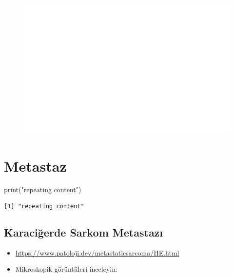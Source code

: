 \documentclass[
  letterpaper,
  DIV=11,
  numbers=noendperiod]{scrreprt}
\newenvironment{Shaded}{}{}
\newcommand{\FunctionTok}[1]{\textcolor[rgb]{0.02,0.16,0.49}{#1}}
\newcommand{\NormalTok}[1]{#1}
\newcommand{\StringTok}[1]{\textcolor[rgb]{0.25,0.44,0.63}{#1}}
\begin{document}
\begin{figure}[H]

{\centering 

\href{https://www.patoloji.dev/ectopic-adrenal/HE.html}{\includegraphics{./heterotopi_files/figure-pdf/unnamed-chunk-5-1.pdf}}

}

\end{figure}

\hypertarget{metastaz}{%
\chapter{Metastaz}\label{metastaz}}

\begin{Shaded}
\begin{Highlighting}[]
\FunctionTok{print}\NormalTok{(}\StringTok{"repeating content"}\NormalTok{)}
\end{Highlighting}
\end{Shaded}

\begin{verbatim}
[1] "repeating content"
\end{verbatim}

\hypertarget{karaciux11ferde-sarkom-metastazux131}{%
\section{Karaciğerde Sarkom
Metastazı}\label{karaciux11ferde-sarkom-metastazux131}}

\begin{itemize}
\item
  \url{https://www.patoloji.dev/metastaticsarcoma/HE.html}
\item
  Mikroskopik görüntüleri inceleyin:
\end{itemize}
\end{document}
